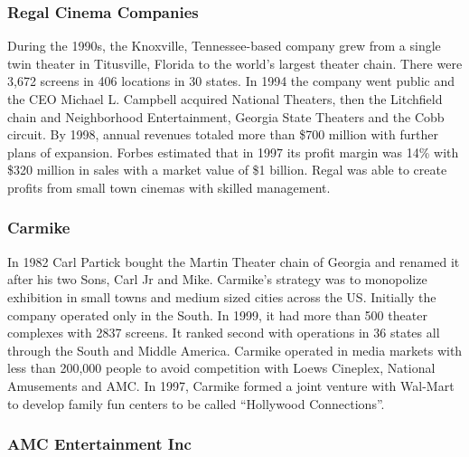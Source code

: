 \documentclass[12pt]{article}
\begin{document}
\subsubsection{Regal Cinema Companies}

During the 1990s, the Knoxville, Tennessee-based company grew from a single twin theater in Titusville, Florida to the world’s largest theater chain. There were 3,672 screens in 406 locations in 30 states. In 1994 the company went public and the CEO Michael L. Campbell acquired National Theaters, then the Litchfield chain and Neighborhood Entertainment, Georgia State Theaters and the Cobb circuit.  By 1998, annual revenues totaled more than \$700 million with further plans of expansion. Forbes estimated that in 1997 its profit margin was 14\% with \$320 million in sales with a market value of \$1 billion. Regal was able to create profits from small town cinemas with skilled management. 

\subsubsection{Carmike} 

In 1982 Carl Partick bought the Martin Theater chain of Georgia and renamed it after his two Sons, Carl Jr and Mike. Carmike’s strategy was to monopolize exhibition in small towns and medium sized cities across the US. Initially the company operated only in the South. In 1999, it had more than 500 theater complexes with 2837 screens. It ranked second with operations in 36 states all through the South and Middle America. Carmike operated in media markets with less than 200,000 people to avoid competition with Loews Cineplex, National Amusements and AMC. In 1997, Carmike formed a joint venture with Wal-Mart to develop family fun centers to be called “Hollywood Connections”. 

\subsubsection{AMC Entertainment Inc }
\end{document}
